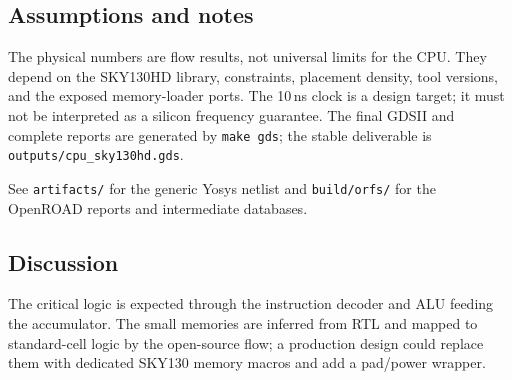 \subsection{Assumptions and notes}
The physical numbers are flow results, not universal limits for the CPU. They
depend on the SKY130HD library, constraints, placement density, tool versions,
and the exposed memory-loader ports. The 10\,ns clock is a design target; it
must not be interpreted as a silicon frequency guarantee. The final GDSII and
complete reports are generated by \texttt{make gds}; the stable deliverable is
\texttt{outputs/cpu\_sky130hd.gds}.

See \texttt{artifacts/} for the generic Yosys netlist and
\texttt{build/orfs/} for the OpenROAD reports and intermediate databases.

\subsection{Discussion}
The critical logic is expected through the instruction decoder and ALU feeding
the accumulator. The small memories are inferred from RTL and mapped to
standard-cell logic by the open-source flow; a production design could replace
them with dedicated SKY130 memory macros and add a pad/power wrapper.

